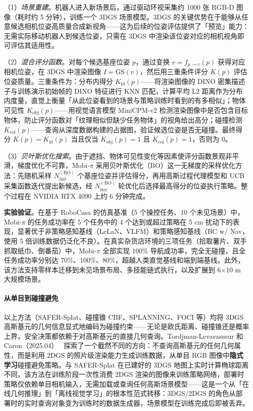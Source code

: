 （1）\textit{场景重建}。机器人进入新场景后，通过驱动环视采集约 1000 张 RGB-D 图像（耗时约 5 分钟），训练一个 3DGS 场景模型。3DGS 的关键优势在于能够从任意候选相机位姿高质量合成新视角——这为后续的位姿评估提供了「预览」能力：无需实际移动机器人到候选位姿，只需在 3DGS 中渲染该位姿对应的相机视角即可评估其适用性。

（2）\textit{混合评分函数}。对每个候选基座位姿 $p$，通过变换 $v = f_{p \to v}(p)$ 获得对应相机位姿，在 3DGS 中渲染图像 $I = \text{GS}(v)$，然后用三重条件评分 $K(p)$ 评估位姿质量。三重条件为：分布内得分 $K_{\text{id}}(p)$——将渲染图像的 DINO 密集描述子与训练演示初始帧的 DINO 特征进行 KNN 匹配，计算平均 L2 距离作为分布内度量，直觉上衡量「从此位姿看到的场景与策略训练时看到的有多相似」；物体可见性 $K_{\text{obj}}(p)$——用视觉语言模型 MiniCPM-v2 检测渲染图像中是否包含目标物体，防止评分函数对「纹理相似但缺少任务物体」的视角给出高分；碰撞检测 $K_{\text{col}}(p)$——查询从深度数据构建的占据图，验证候选位姿是否无碰撞。最终得分 $K(p) = K_{\text{id}}(p)$ 当且仅当 $K_{\text{obj}}(p)=1$ 且 $K_{\text{col}}(p)=1$，否则为 0。

（3）\textit{贝叶斯优化搜索}。由于遮挡、物体可见性变化等因素使评分函数景观非平滑，梯度优化不可靠，Mobi-$\pi$ 采用贝叶斯优化（BO）这一无梯度的采样优化方法：先随机采样 $N^{(\text{BO})}_{\text{init}}$ 个基座位姿并评估得分，再用高斯过程代理模型和 UCB 采集函数迭代提出新候选，经 $N^{(\text{BO})}_{\text{iter}}$ 轮优化后选择最高得分的位姿执行策略。整个过程在 NVIDIA RTX 4090 上约 6 分钟完成。

\textbf{实验验证}。在基于 RoboCasa 的仿真基准（5 个操控任务、10 个未见场景）中，Mobi-$\pi$ 的任务成功率在 5 个任务中的 4 个达到或超过策略在 5 cm 扰动下的表现，显著优于非策略感知基线（LeLaN、VLFM）和策略感知基线（BC w/ Nav，使用 5 倍训练数据仍泛化不良）。在真实杂货店环境的三项任务（拾取薯片、双手抓取纸巾、倒番茄）中，Mobi-$\pi$ 全部实现 100\% 导航成功率，完全无碰撞，且全任务成功率分别达 70\%、100\%、80\%，超越人类直觉基线和端到端基线。此外，该方法支持零样本迁移到未见场景布局、多技能链式执行，以及扩展到 6$\times$10 m 大规模场景。

\paragraph{从单目到碰撞避免}

以上方法（SAFER-Splat、碰撞锥 CBF、SPLANNING、FOCI 等）均将 3DGS 高斯基元的几何信息显式地编码为碰撞约束——无论是欧氏距离、碰撞锥还是概率上界，安全决策都依赖于对高斯基元的直接几何查询。Tordjman-Levavasseur 和 Caron（2025.04）~\cite{2504_06651} 探索了一个截然不同的方向：不查询高斯基元的任何几何属性，而是利用 2DGS 的照片级渲染能力生成训练数据，从单目 RGB 图像中\textbf{隐式学习}碰撞避免策略。与 SAFER-Splat 在已建好的 3DGS 地图上实时计算椭球距离不同，该方法在训练阶段一次性消费 2DGS 渲染的图像来训练策略网络，部署时策略仅依赖单目相机输入，无需加载或查询任何高斯场景模型——这是一个从「在线几何推理」到「离线视觉学习」的根本性范式转移：3DGS/2DGS 的角色从部署时的实时查询对象变为训练时的数据生成器，场景模型在训练完成后即被丢弃。

